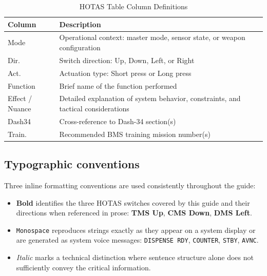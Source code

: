 \documentclass[11pt, a4paper, twoside]{report}
\begin{document}
\begin{table}[H]
	\centering
	\caption{HOTAS Table Column Definitions}
	\label{tab:C1-hotastable-format}
	\small
	\renewcommand{\arraystretch}{1.25}
	\begin{tabular}{L{2.2cm} L{11.5cm}}
		\toprule
		\textbf{Column} & \textbf{Description} \\
		\midrule
		Mode & Operational context: master mode, sensor state, or weapon configuration \\
		Dir. & Switch direction: Up, Down, Left, or Right \\
		Act. & Actuation type: Short press or Long press \\
		Function & Brief name of the function performed \\
		Effect / Nuance & Detailed explanation of system behavior, constraints, and tactical considerations \\
		Dash34 & Cross-reference to Dash-34 section(s) \\
		Train. & Recommended BMS training mission number(s) \\
		\bottomrule
	\end{tabular}
\end{table}

\subsection{Typographic conventions}
\label{sec:C1-S3-S3}

Three inline formatting conventions are used consistently throughout the guide:

\begin{itemize}
	\item \textbf{Bold} identifies the three HOTAS switches covered by this guide and their directions when referenced in prose: \textbf{TMS Up}, \textbf{CMS Down}, \textbf{DMS Left}.
	\item \texttt{Monospace} reproduces strings exactly as they appear on a system display or are generated as system voice messages: \texttt{DISPENSE RDY}, \texttt{COUNTER}, \texttt{STBY}, \texttt{AVNC}.
	\item \textit{Italic} marks a technical distinction where sentence structure alone does not sufficiently convey the critical information.
\end{itemize}
\end{document}
